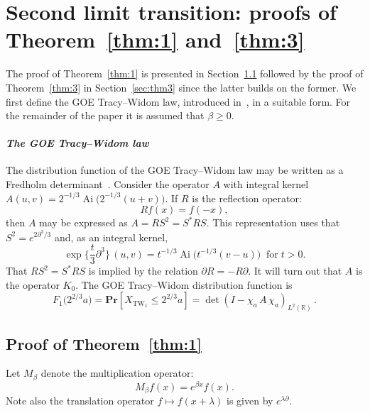 \documentclass[AHL,Unicode,longabstracts]{cedram}
\DeclareMathOperator{\tw}{TW}
\DeclareMathOperator{\Ai}{Ai}
\newcommand{\pr}[1]{\mathbf{Pr}\left[#1\right]}
\newcommand{\R}{\mathbb{R}}
\begin{document}
\section{Second limit transition: proofs of Theorem~\ref{thm:1} and~\ref{thm:3}} \label{sec:mainthm}

The proof of Theorem~\ref{thm:1} is presented in Section~\ref{sec:thm1} followed by the proof of Theorem~\ref{thm:3} in Section~\ref{sec:thm3} since the latter builds on the former. We first define the GOE Tracy--Widom law, introduced in~\cite{TW}, in a suitable form. For the remainder of the paper it is assumed that $\beta \geq 0$.

\paragraph{\emph{The GOE Tracy--Widom law}}
The distribution function of the GOE Tracy--Widom law may be written as a Fredholm determinant~\cite{FS}. Consider the operator $A$ with integral kernel $A(u,v) = 2^{-1/3}\Ai\big(2^{-1/3}(u+v)\big)$. If $R$ is the reflection operator:
\begin{equation}\label{eqn:R}
Rf(x) = f(-x),
\end{equation}
then $A$ may be expressed as $A = R S^2 = S^{*}RS$. This representation uses that $S^2 = e^{2\partial^3/3}$ and, as an integral kernel,
\[
\exp \Big \{\frac{t}{3} \partial^3 \Big \}\,(u,v) = t^{-1/3} \Ai \big(t^{-1/3}(v-u)\big)\;\;\text{for}\; t > 0.
\]
That $RS^2 = S^{*}RS$ is implied by the relation $\partial R = - R \partial$. It will turn out that $A$ is the operator $K_{0}$. The GOE Tracy--Widom distribution function is
\begin{equation}\label{eqn:AGOE}
F_1\big(2^{2/3}a \big) = \pr{X_{\tw_1} \leq 2^{2/3} a} = \det (I - \chi_{a} \,A \, \chi_{a})_{L^2(\R)}\,.
\end{equation}

\subsection{Proof of Theorem~\ref{thm:1}} \label{sec:thm1}

Let $M_{\beta}$ denote the multiplication operator:
\[
M_{\beta}f(x) = e^{\beta x} f(x).
\]
Note also the translation operator $f \mapsto f(x+\lambda)$ is given by $e^{\lambda \partial}$.
\end{document}
